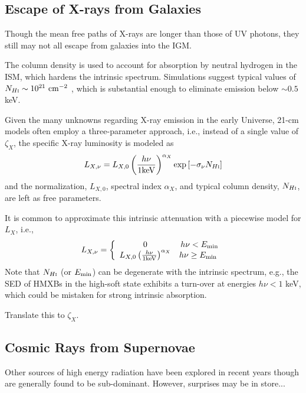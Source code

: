\subsection{Escape of X-rays from Galaxies}
Though the mean free paths of X-rays are longer than those of UV photons, they still may not all escape from galaxies into the IGM. 

The column density is used to account for absorption by neutral hydrogen in the ISM, which hardens the intrinsic spectrum. Simulations suggest typical values of $\NHI \sim 10^{21} \ \mathrm{cm}^{-2}$ \cite{Das2017}, which is substantial enough to eliminate emission below $\sim 0.5$ keV. 

Given the many unknowns regarding X-ray emission in the early Universe, 21-cm models often employ a three-parameter approach, i.e., instead of a single value of $\zeta_X$, the specific X-ray luminosity is modeled as 
\begin{equation}
	L_{X,\nu} = L_{X,0} \left(\frac{h \nu}{1 \mathrm{keV}} \right)^{\alpha_X} \exp\left[-\sigma_{\nu} N_{H\textsc{i}} \right]
\end{equation}
and the normalization, $L_{X,0}$, spectral index $\alpha_X$, and typical column density, $N_{H\textsc{i}}$, are left as free parameters. 

It is common to approximate this intrinsic attenuation with a piecewise model for $L_X$, i.e., 
\begin{align}
L_{X,\nu} = \left\{ \begin{array}{cc} 
                0 & h\nu < E_{\min} \\
                L_{X,0} \left(\frac{h \nu}{1 \mathrm{keV}} \right)^{\alpha_X} & h\nu \geq E_{\min} \
                \end{array} \right.
\end{align}
Note that $N_{H\textsc{i}}$ (or $E_{\min}$) can be degenerate with the intrinsic spectrum, e.g., the SED of HMXBs in the high-soft state exhibits a turn-over at energies $h\nu < 1$ keV, which could be mistaken for strong intrinsic absorption.

{\color{red} Translate this to $\zeta_X$.}


\subsection{Cosmic Rays from Supernovae}
{\color{red} Other sources of high energy radiation have been explored in recent years though are generally found to be sub-dominant. However, surprises may be in store...}



